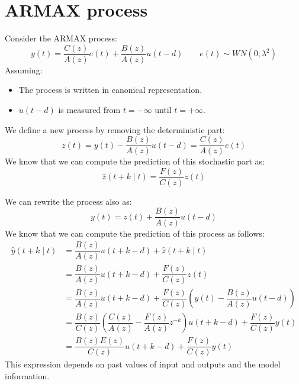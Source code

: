 \section{ARMAX process}

Consider the ARMAX process:
\[y(t)=\dfrac{C(z)}{A(z)}e(t)+\dfrac{B(z)}{A(z)}u(t-d) \qquad e(t)\sim WN(0,\lambda^2)\]
Assuming:
\begin{itemize}
    \item The process is written in canonical representation.
    \item $u(t-d)$ is measured from $t=-\infty$ until $t=+\infty$.
\end{itemize} 
We define a new process by removing the deterministic part:
\[z(t)=y(t)-\dfrac{B(z)}{A(z)}u(t-d)=\dfrac{C(z)}{A(z)}e(t)\]
We know that we can compute the prediction of this stochastic part as:
\[\hat{z}(t+k\mid t)=\dfrac{F(z)}{C(z)}z(t)\]

We can rewrite the process also as:
\[y(t)=z(t)+\dfrac{B(z)}{A(z)}u(t-d)\]
We know that we can compute the prediction of this process as follows:
\begin{align*}
    \hat{y}(t+k\mid t)  &=\dfrac{B(z)}{A(z)}u(t+k-d)+\hat{z}(t+k\mid t) \\
                    &=\dfrac{B(z)}{A(z)}u(t+k-d)+\dfrac{F(z)}{C(z)}z(t) \\
                    &=\dfrac{B(z)}{A(z)}u(t+k-d)+\dfrac{F(z)}{C(z)}\left( y(t)-\dfrac{B(z)}{A(z)}u(t-d) \right) \\
                    &=\dfrac{B(z)}{C(z)}\left( \dfrac{C(z)}{A(z)} - \dfrac{F(z)}{A(z)}z^{-k} \right)u(t+k-d) + \dfrac{F(z)}{C(z)}y(t) \\
                    &=\dfrac{B(z)E(z)}{C(z)}u(t+k-d) + \dfrac{F(z)}{C(z)}y(t) 
\end{align*}
This expression depends on past values of input and outputs and the model information.